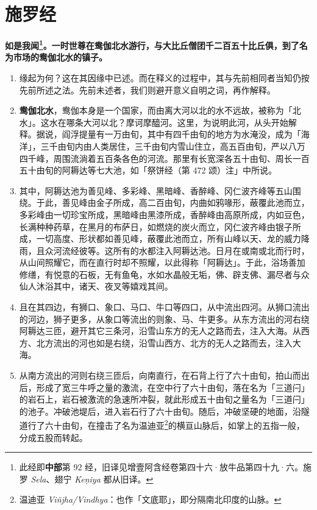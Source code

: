 \section{施罗经}

\textbf{如是我闻\footnote{此经即\textbf{中部}第 92 经，旧译见增壹阿含经卷第四十六·放牛品第四十九·六。施罗 \textit{Sela}、翅宁 \textit{Keṇiya} 都从旧译。}。一时世尊在鸯伽北水游行，与大比丘僧团千二百五十比丘俱，到了名为市场的鸯伽北水的镇子。}

\begin{enumerate}\item 缘起为何？这在其因缘中已述。而在释义的过程中，其与先前相同者当知仍按先前所述之法。先前未述者，我们则避开意义自明之词，再作解释。
\item \textbf{鸯伽北水}，鸯伽本身是一个国家，而由离大河以北的水不远故，被称为「北水」。这水在哪条大河以北？摩诃摩醯河。这里，为说明此河，从头开始解释。据说，阎浮提量有一万由旬，其中有四千由旬的地方为水淹没，成为「海洋」，三千由旬内由人类居住，三千由旬内雪山住立，高五百由旬，严以八万四千峰，周围流淌着五百条各色的河流。那里有长宽深各五十由旬、周长一百五十由旬的阿耨达等七大池，如「祭饼经（第 472 颂）注」中所说。
\item 其中，阿耨达池为善见峰、多彩峰、黑暗峰、香醉峰、冈仁波齐峰等五山围绕。于此，善见峰由金子所成，高二百由旬，内曲如鸦喙形，蔽覆此池而立，多彩峰由一切珍宝所成，黑暗峰由黑漆所成，香醉峰由高原所成，内如豆色，长满种种药草，在黑月的布萨日，如燃烧的炭火而立，冈仁波齐峰由银子所成，一切高度、形状都如善见峰，蔽覆此池而立，所有山峰以天、龙的威力降雨，且众河流经彼等。这所有的水都注入阿耨达池。日月在或南或北而行时，从山间照耀它，而在直行时却不照耀，以此得称「阿耨达」。于此，浴场善加修缮，有悦意的石板，无有鱼龟，水如水晶般无垢，佛、辟支佛、漏尽者与众仙人沐浴其中，诸天、夜叉等嬉戏其间。
\item 且在其四边，有狮口、象口、马口、牛口等四口，从中流出四河。从狮口流出的河边，狮子更多，从象口等流出的则象、马、牛更多。从东方流出的河右绕阿耨达三匝，避开其它三条河，沿雪山东方的无人之路而去，注入大海。从西方、北方流出的河也如是右绕，沿雪山西方、北方的无人之路而去，注入大海。
\item 从南方流出的河则右绕三匝后，向南直行，在石背上行了六十由旬，拍山而出后，形成了宽三牛呼之量的激流，在空中行了六十由旬，落在名为「三道闩」的岩石上，岩石被激流的急速所冲裂，就此形成五十由旬之量名为「三道闩」的池子。冲破池堤后，进入岩石行了六十由旬。随后，冲破坚硬的地面，沿隧道行了六十由旬，在撞击了名为温迪亚\footnote{温迪亚 \textit{Viñjha/Vindhya}：也作「文底耶」，即分隔南北印度的山脉。}的横亘山脉后，如掌上的五指一般，分成五股而转起。

\end{enumerate}
